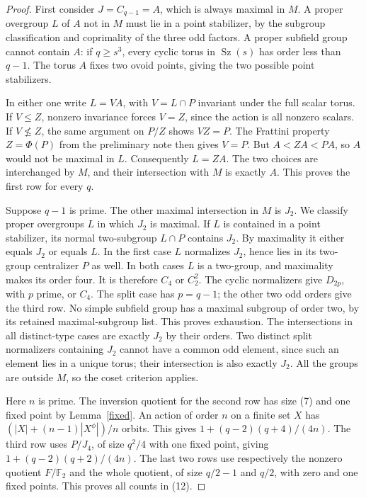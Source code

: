 \documentclass[11pt,a4paper]{article}
\newcommand{\F}{\mathbb F}
\newcommand{\Sz}{\operatorname{Sz}}
\begin{document}
\begin{proof}
First consider $J=C_{q-1}=A$, which is always maximal in $M$.
A proper overgroup $L$ of $A$ not in $M$ must lie in a point
stabilizer, by the subgroup classification and coprimality of
the three odd factors. A proper subfield group cannot contain
$A$: if $q\ge s^3$, every cyclic torus in $\Sz(s)$ has order
less than $q-1$. The torus $A$ fixes two ovoid points, giving
the two possible point stabilizers.

In either one write $L=VA$, with $V=L\cap P$ invariant under
the full scalar torus. If $V\le Z$, nonzero invariance forces
$V=Z$, since the action is all nonzero scalars. If $V\nleq Z$,
the same argument on $P/Z$ shows $VZ=P$. The Frattini property
$Z=\Phi(P)$ from the preliminary note then gives $V=P$.
But $A<ZA<PA$, so $A$ would not be maximal in $L$.
Consequently $L=ZA$. The two choices are interchanged by $M$,
and their intersection with $M$ is exactly $A$. This proves the
first row for every $q$.

Suppose $q-1$ is prime. The other maximal intersection in $M$
is $J_2$. We classify proper overgroups $L$ in which $J_2$ is
maximal. If $L$ is contained in a point stabilizer, its normal
two-subgroup $L\cap P$ contains $J_2$. By maximality it either
equals $J_2$ or equals $L$. In the first case $L$ normalizes
$J_2$, hence lies in its two-group centralizer $P$ as well.
In both cases $L$ is a two-group, and maximality makes its
order four. It is therefore $C_4$ or $C_2^2$.
The cyclic normalizers give $D_{2p}$, with $p$ prime, or $C_4$.
The split case has $p=q-1$; the other two odd orders give the
third row. No simple subfield group has a maximal subgroup of
order two, by its retained maximal-subgroup list. This proves
exhaustion. The intersections in all distinct-type cases are
exactly $J_2$ by their orders. Two distinct split normalizers
containing $J_2$ cannot have a common odd element, since such
an element lies in a unique torus; their intersection is also
exactly $J_2$. All the groups are outside $M$, so the coset
criterion applies.

Here $n$ is prime. The inversion quotient for the second row
has size (7) and one fixed point by Lemma~\ref{fixed}. An action
of order $n$ on a finite set $X$ has
$(|X|+(n-1)|X^\phi|)/n$ orbits. This gives
$1+(q-2)(q+4)/(4n)$. The third row uses $P/J_4$, of size
$q^2/4$ with one fixed point, giving
$1+(q-2)(q+2)/(4n)$. The last two rows use respectively the
nonzero quotient $F/\F_2$ and the whole quotient, of size
$q/2-1$ and $q/2$, with zero and one fixed points. This proves
all counts in (12).


\end{proof}
\end{document}
